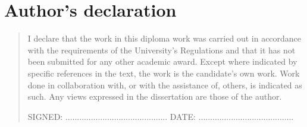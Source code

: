 %
%
\chapter{Author's declaration}
\begin{SingleSpace}
\begin{quote}
I declare that the work in this diploma work was carried out in accordance with the requirements of  the University's Regulations and that it  has not been submitted for any other academic award. Except where indicated by specific references in the text, the work is the candidate's own work. Work done in collaboration with, or with the assistance of, others, is indicated as such. Any views expressed in the dissertation are those of the author.

\vspace{1.5cm}
\noindent
\hspace{-0.75cm}\textsc{SIGNED: ............................................
DATE: .........................................}
\end{quote}
\end{SingleSpace}
